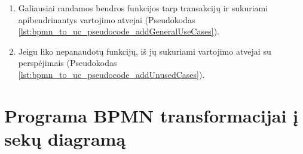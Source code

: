 \documentclass{VUMIFInfBakalaurinis}
\begin{document}
\begin{enumerate}
	\item Galiausiai randamos bendros funkcijos tarp transakcijų ir sukuriami apibendrinantys vartojimo atvejai (Pseudokodas  \ref{lst:bpmn_to_uc_pseudocode_addGeneralUseCases}).
	
	\item Jeigu liko nepanaudotų funkcijų, iš jų sukuriami vartojimo atvejai su perspėjimais (Pseudokodas \ref{lst:bpmn_to_uc_pseudocode_addUnusedCases}).
	
\end{enumerate} 






\section{Programa \textbf{BPMN} transformacijai į \textbf{sekų diagramą}}   





\printbibliography[heading=bibintoc] %
\end{document}
